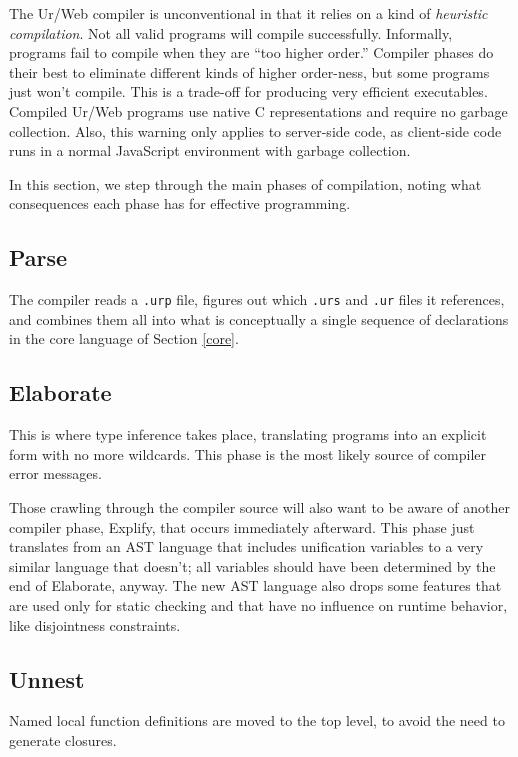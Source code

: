 \documentclass{article}
\begin{document}
The Ur/Web compiler is unconventional in that it relies on a kind of \emph{heuristic compilation}.  Not all valid programs will compile successfully.  Informally, programs fail to compile when they are ``too higher order.''  Compiler phases do their best to eliminate different kinds of higher order-ness, but some programs just won't compile.  This is a trade-off for producing very efficient executables.  Compiled Ur/Web programs use native C representations and require no garbage collection.  Also, this warning only applies to server-side code, as client-side code runs in a normal JavaScript environment with garbage collection.

In this section, we step through the main phases of compilation, noting what consequences each phase has for effective programming.

\subsection{Parse}

The compiler reads a \texttt{.urp} file, figures out which \texttt{.urs} and \texttt{.ur} files it references, and combines them all into what is conceptually a single sequence of declarations in the core language of Section \ref{core}.

\subsection{Elaborate}

This is where type inference takes place, translating programs into an explicit form with no more wildcards.  This phase is the most likely source of compiler error messages.

Those crawling through the compiler source will also want to be aware of another compiler phase, Explify, that occurs immediately afterward.  This phase just translates from an AST language that includes unification variables to a very similar language that doesn't; all variables should have been determined by the end of Elaborate, anyway.  The new AST language also drops some features that are used only for static checking and that have no influence on runtime behavior, like disjointness constraints.

\subsection{Unnest}

Named local function definitions are moved to the top level, to avoid the need to generate closures.
\end{document}
